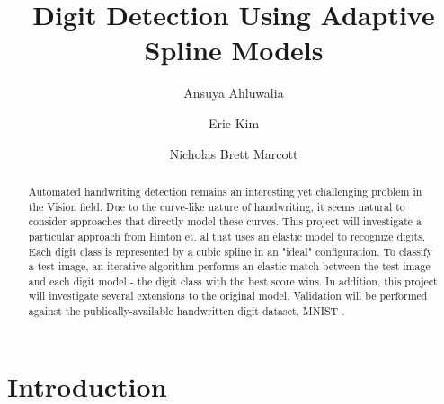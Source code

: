 \documentclass[oribibl]{llncs}
\begin{document}
\title{Digit Detection Using Adaptive Spline Models}
\author{ Ansuya Ahluwalia \and Eric Kim \and Nicholas Brett Marcott }
\maketitle

\begin{abstract}

Automated handwriting detection remains an interesting yet challenging problem in the Vision field. Due to the curve-like nature of handwriting, it seems natural to consider approaches that directly model these curves. This project will investigate a particular approach from Hinton et. al \cite{Hinton92adaptiveelastic} that uses an elastic model to recognize digits. Each digit class is represented by a cubic spline in an "ideal" configuration. To classify a test image, an iterative algorithm performs an elastic match between the test image and each digit model - the digit class with the best score wins. In addition, this project will investigate several extensions to the original model. Validation will be performed against the publically-available handwritten digit dataset, MNIST \cite{mnist}.

\end{abstract}


\section{Introduction}
\end{document}
